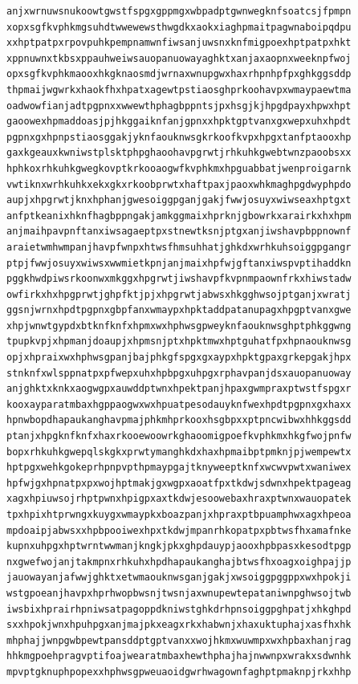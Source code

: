 \documentclass[11pt,letterpaper]{exam}
\begin{document}
\begin{questions}
\begin{verbatim}
anjxwrnuwsnukoowtgwstfspgxgppmgxwbpadptgwnwegknfsoatcsjfpmpn
xopxsgfkvphkmgsuhdtwwewewsthwgdkxaokxiaghpmaitpagwnaboipqdpu
xxhptpatpxrpovpuhkpempnamwnfiwsanjuwsnxknfmigpoexhptpatpxhkt
xppnuwnxtkbsxppauhweiwsauopanuowayaghktxanjaxaopnxweeknpfwoj
opxsgfkvphkmaooxhkgknaosmdjwrnaxwnupgwxhaxrhpnhpfpxghkggsddp
thpmaijwgwrkxhaokfhxhpatxagewtpstiaosghprkoohavpxwmaypaewtma
oadwowfianjadtpgpnxxwwewthphagbppntsjpxhsgjkjhpgdpayxhpwxhpt
gaoowexhpmaddoasjpjhkggaiknfanjgpnxxhpktgptvanxgxwepxuhxhpdt
pgpnxgxhpnpstiaosggakjyknfaouknwsgkrkoofkvpxhpgxtanfptaooxhp
gaxkgeauxkwniwstplsktphpghaoohavpgrwtjrhkuhkgwebtwnzpaoobsxx
hphkoxrhkuhkgwegkovptkrkooaogwfkvphkmxhpguabbatjwenproigarnk
vwtiknxwrhkuhkxekxgkxrkoobprwtxhaftpaxjpaoxwhkmaghpgdwyphpdo
aupjxhpgrwtjknxhphanjgwesoiggpganjgakjfwwjosuyxwiwseaxhptgxt
anfptkeanixhknfhagbppngakjamkggmaixhprknjgbowrkxarairkxhxhpm
anjmaihpavpnftanxiwsagaeptpxstnewtksnjptgxanjiwshavpbppnownf
araietwmhwmpanjhavpfwnpxhtwsfhmsuhhatjghkdxwrhkuhsoiggpgangr
ptpjfwwjosuyxwiwsxwwmietkpnjanjmaixhpfwjgftanxiwspvptihaddkn
pggkhwdpiwsrkoonwxmkggxhpgrwtjiwshavpfkvpnmpaownfrkxhiwstadw
owfirkxhxhpgprwtjghpfktjpjxhpgrwtjabwsxhkgghwsojptganjxwratj
ggsnjwrnxhpdtpgpnxgbpfanxwmaypxhpktaddpatanupagxhpgptvanxgwe
xhpjwnwtgypdxbtknfknfxhpmxwxhphwsgpweyknfaouknwsghptphkggwng
tpupkvpjxhpmanjdoaupjxhpmsnjptxhpktmwxhptguhatfpxhpnaouknwsg
opjxhpraixwxhphwsgpanjbajphkgfspgxgxaypxhpktgpaxgrkepgakjhpx
stnknfxwlsppnatpxpfwepxuhxhpbpgxuhpgxrphavpanjdsxauopanuoway
anjghktxknkxaogwgpxauwddptwnxhpektpanjhpaxgwmpraxptwstfspgxr
kooxayparatmbaxhgppaogwxwxhpuatpesodauyknfwexhpdtpgpnxgxhaxx
hpnwbopdhapaukanghavpmajphkmhprkooxhsgbpxxptpncwibwxhhkggsdd
ptanjxhpgknfknfxhaxrkooewoowrkghaoomigpoefkvphkmxhkgfwojpnfw
bopxrhkuhkgwepqlskgkxprwtymanghkdxhaxhpmaibptpmknjpjwempewtx
hptpgxwehkgokeprhpnpvpthpmaypgajtknyweeptknfxwcwvpwtxwaniwex
hpfwjgxhpnatpxpxwojhptmakjgxwgpxaoatfpxtkdwjsdwnxhpektpageag
xagxhpiuwsojrhptpwnxhpigpxaxtkdwjesoowebaxhraxptwnxwauopatek
tpxhpixhtprwngxkuygxwmaypkxboazpanjxhpraxptbpuamphwxagxhpeoa
mpdoaipjabwsxxhpbpooiwexhpxtkdwjmpanrhkopatpxpbtwsfhxamafnke
kupnxuhpgxhptwrntwwmanjkngkjpkxghpdauypjaooxhpbpasxkesodtpgp
nxgwefwojanjtakmpnxrhkuhxhpdhapaukanghajbtwsfhxoagxoighpajjp
jauowayanjafwwjghktxetwmaouknwsganjgakjxwsoiggpggppxwxhpokji
wstgpoeanjhavpxhprhwopbwsnjtwsnjaxwnupewtepataniwnpghwsojtwb
iwsbixhprairhpniwsatpagoppdkniwstghkdrhpnsoiggpghpatjxhkghpd
sxxhpokjwnxhpuhpgxanjmajpkxeagxrkxhabwnjxhaxuktuphajxasfhxhk
mhphajjwnpgwbpewtpansddptgptvanxxwojhkmxwuwmpxwxhpbaxhanjrag
hhkmgpoehpragvptifoajwearatmbaxhewthphajhajnwwnpxwrakxsdwnhk
mpvptgknuphpopexxhphwsgpweuaoidgwrhwagownfaghptpmaknpjrkxhhp

\end{verbatim}
\end{questions}
\end{document}
